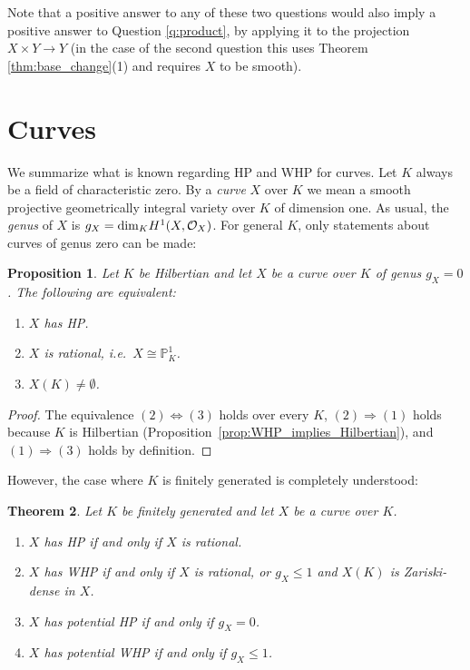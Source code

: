 \documentclass[10pt,a4paper]{amsart}
\theoremstyle{plain}
\newtheorem{theorem}{Theorem}
\newtheorem{proposition}[theorem]{Proposition}
\theoremstyle{remark}
\numberwithin{theorem}{section}
\begin{document}
Note that a positive answer to 
any of these two questions
would also imply 
a positive answer to Question \ref{q:product},
by applying it to the projection $X\times Y\rightarrow Y$
(in the case of the second question 
this uses Theorem \ref{thm:base_change}(1)
and requires $X$ to be smooth). 


\section{Curves}
\label{sec:curves}
 
\noindent
We summarize what is known regarding HP and WHP for curves.
Let $K$ always be a field of characteristic zero.
By a {\em curve} $X$ over $K$ we mean
a smooth projective geometrically integral variety over $K$ of dimension one.
As usual, the {\em genus} of $X$ is $g_X={\rm dim}_KH^1(X,\mathcal{O}_X)$. 
For general $K$,
only statements about curves of genus zero can be made:

\begin{proposition}\label{prop:curve0}
Let $K$ be Hilbertian
and let $X$ be a 
curve over $K$
of genus $g_X=0$.
The following are equivalent:
\begin{enumerate}
    \item $X$ has HP.
    \item $X$ is rational, i.e.~$X\cong\mathbb{P}_K^1$.
    \item $X(K)\neq\emptyset$.
\end{enumerate}
\end{proposition}

\begin{proof}
The equivalence $(2)\Leftrightarrow(3)$ holds over every $K$,
$(2)\Rightarrow(1)$ holds because $K$ is Hilbertian
(Proposition~\ref{prop:WHP_implies_Hilbertian}),
and $(1)\Rightarrow(3)$ holds by definition.
\end{proof}

However, the case where $K$ is finitely generated is completely understood:
 
\begin{theorem}\label{thm:curves}
Let $K$ be finitely generated
and let $X$ be a 
 curve over $K$.
 \begin{enumerate}
\item $X$ has HP if and only if $X$ is rational. 
\item  $X$ has WHP if and only if $X$ is rational, or $g_X\leq 1$ and  $X(K)$ is Zariski-dense in $X$.  
\item $X$ has potential HP if and only if $g_X=0$.
\item $X$ has potential WHP if and only if   $g_X\leq 1$.
\end{enumerate}
\end{theorem}
\end{document}
